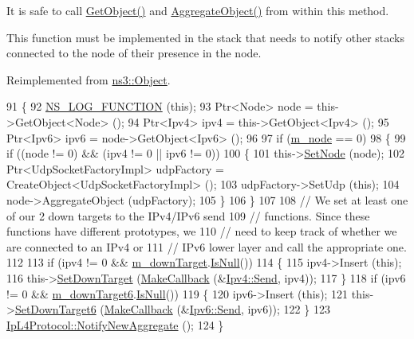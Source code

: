 It is safe to call \hyperlink{classns3_1_1Object_a13e18c00017096c8381eb651d5bd0783}{Get\+Object()} and \hyperlink{classns3_1_1Object_a79dd435d300f3deca814553f561a2922}{Aggregate\+Object()} from within this method.

This function must be implemented in the stack that needs to notify other stacks connected to the node of their presence in the node. 

Reimplemented from \hyperlink{classns3_1_1Object_a1bd7211125185a6cd511c35fea4e500f}{ns3\+::\+Object}.


\begin{DoxyCode}
91 \{
92   \hyperlink{log-macros-disabled_8h_a90b90d5bad1f39cb1b64923ea94c0761}{NS\_LOG\_FUNCTION} (\textcolor{keyword}{this});
93   Ptr<Node> node = this->GetObject<Node> ();
94   Ptr<Ipv4> ipv4 = this->GetObject<Ipv4> ();
95   Ptr<Ipv6> ipv6 = node->GetObject<Ipv6> ();
96 
97   \textcolor{keywordflow}{if} (\hyperlink{classns3_1_1UdpL4Protocol_a3b659100db66be53351016f3875ba62a}{m\_node} == 0)
98     \{
99       \textcolor{keywordflow}{if} ((node != 0) && (ipv4 != 0 || ipv6 != 0))
100         \{
101           this->\hyperlink{classns3_1_1UdpL4Protocol_a495a632be9c6bdef5d6312496b05c1a8}{SetNode} (node);
102           Ptr<UdpSocketFactoryImpl> udpFactory = CreateObject<UdpSocketFactoryImpl> ();
103           udpFactory->SetUdp (\textcolor{keyword}{this});
104           node->AggregateObject (udpFactory);
105         \}
106     \}
107   
108   \textcolor{comment}{// We set at least one of our 2 down targets to the IPv4/IPv6 send}
109   \textcolor{comment}{// functions.  Since these functions have different prototypes, we}
110   \textcolor{comment}{// need to keep track of whether we are connected to an IPv4 or}
111   \textcolor{comment}{// IPv6 lower layer and call the appropriate one.}
112   
113   \textcolor{keywordflow}{if} (ipv4 != 0 && \hyperlink{classns3_1_1UdpL4Protocol_a82401fff4ce9b7f04ef1aa5cfeebd010}{m\_downTarget}.\hyperlink{classns3_1_1Callback_aa8e27826badbf37f84763f36f70d9b54}{IsNull}())
114     \{
115       ipv4->Insert (\textcolor{keyword}{this});
116       this->\hyperlink{classns3_1_1UdpL4Protocol_a799b6bb261184bb06ed33d58fe9bddb4}{SetDownTarget} (\hyperlink{group__makecallbackmemptr_ga9376283685aa99d204048d6a4b7610a4}{MakeCallback} (&\hyperlink{classns3_1_1Ipv4_a81f6cbb774cdc255e3e49490e0960539}{Ipv4::Send}, ipv4));
117     \}
118   \textcolor{keywordflow}{if} (ipv6 != 0 && \hyperlink{classns3_1_1UdpL4Protocol_a82cec3d00eafff718533aa5191624e05}{m\_downTarget6}.\hyperlink{classns3_1_1Callback_aa8e27826badbf37f84763f36f70d9b54}{IsNull}())
119     \{
120       ipv6->Insert (\textcolor{keyword}{this});
121       this->\hyperlink{classns3_1_1UdpL4Protocol_a40555d4abc10c25d7a3aa8eb95d5aeaa}{SetDownTarget6} (\hyperlink{group__makecallbackmemptr_ga9376283685aa99d204048d6a4b7610a4}{MakeCallback} (&\hyperlink{classns3_1_1Ipv6_a2aad308983b20eb54334bb0d3db31004}{Ipv6::Send}, ipv6));
122     \}
123   \hyperlink{classns3_1_1Object_a1bd7211125185a6cd511c35fea4e500f}{IpL4Protocol::NotifyNewAggregate} ();
124 \}
\end{DoxyCode}


